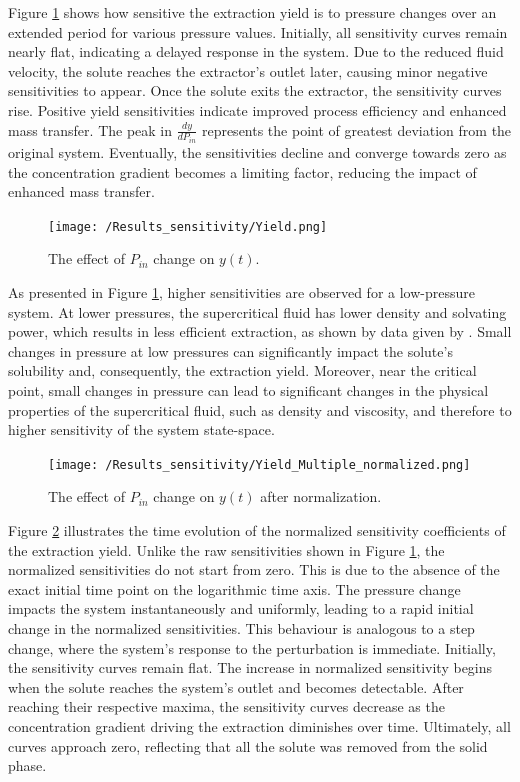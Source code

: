 \documentclass[a4paper,fleqn]{cas-dc}
\begin{document}
	Figure \ref{fig:Sensitivty_P_y} shows how sensitive the extraction yield is to pressure changes over an extended period for various pressure values. Initially, all sensitivity curves remain nearly flat, indicating a delayed response in the system. Due to the reduced fluid velocity, the solute reaches the extractor's outlet later, causing minor negative sensitivities to appear. Once the solute exits the extractor, the sensitivity curves rise. Positive yield sensitivities indicate improved process efficiency and enhanced mass transfer. The peak in $\frac{dy}{dP_{in}}$ represents the point of greatest deviation from the original system. Eventually, the sensitivities decline and converge towards zero as the concentration gradient becomes a limiting factor, reducing the impact of enhanced mass transfer.
	
	\begin{figure}[!ht]
		\centering
		\texttt{[image: /Results\_sensitivity/Yield.png]}
		\caption{The effect of $P_{in}$ change on $y(t)$.}
		\label{fig:Sensitivty_P_y}
	\end{figure}
	
	As presented in Figure \ref{fig:Sensitivty_P_y}, higher sensitivities are observed for a low-pressure system. At lower pressures, the supercritical fluid has lower density and solvating power, which results in less efficient extraction, as shown by data given by \citet{Sliczniuk2024}. Small changes in pressure at low pressures can significantly impact the solute's solubility and, consequently, the extraction yield. Moreover, near the critical point, small changes in pressure can lead to significant changes in the physical properties of the supercritical fluid, such as density and viscosity, and therefore to higher sensitivity of the system state-space.
	
	\begin{figure}[!hb]
		\centering
		\texttt{[image: /Results\_sensitivity/Yield\_Multiple\_normalized.png]}
		\caption{The effect of $P_{in}$ change on $y(t)$ after normalization.}
		\label{fig:Sensitivty_P_y_norm}
	\end{figure}
			
	Figure \ref{fig:Sensitivty_P_y_norm} illustrates the time evolution of the normalized sensitivity coefficients of the extraction yield. Unlike the raw sensitivities shown in Figure \ref{fig:Sensitivty_P_y}, the normalized sensitivities do not start from zero. This is due to the absence of the exact initial time point on the logarithmic time axis. The pressure change impacts the system instantaneously and uniformly, leading to a rapid initial change in the normalized sensitivities. This behaviour is analogous to a step change, where the system's response to the perturbation is immediate. Initially, the sensitivity curves remain flat. The increase in normalized sensitivity begins when the solute reaches the system's outlet and becomes detectable. After reaching their respective maxima, the sensitivity curves decrease as the concentration gradient driving the extraction diminishes over time. Ultimately, all curves approach zero, reflecting that all the solute was removed from the solid phase.
	
\end{document}
